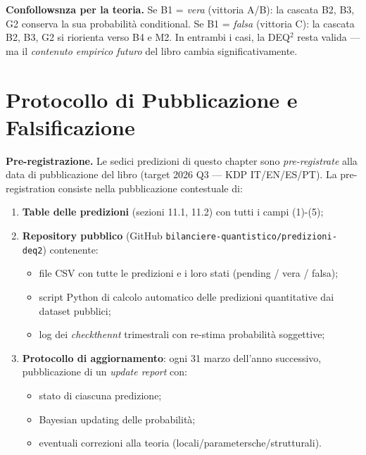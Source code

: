 \Hypoth{} \textbf{Confollowsnza per la teoria.} Se B1 = \emph{vera}
(vittoria A/B): la cascata B2, B3, G2 conserva la sua probabilità
conditional. Se B1 = \emph{falsa} (vittoria C): la cascata B2, B3, G2
si riorienta verso B4 e M2. In entrambi i casi, la DEQ$^2$ resta valida ---
ma il \emph{contenuto empirico futuro} del libro cambia
significativamente.



\section{Protocollo di Pubblicazione e
Falsificazione}\label{protocollo-di-pubblicazione-e-falsification}

\Hypoth{} \textbf{Pre-registrazione.} Le sedici predizioni di questo
chapter sono \emph{pre-registrate} alla data di pubblicazione del libro
(target 2026 Q3 --- KDP IT/EN/ES/PT). La pre-registration consiste
nella pubblicazione contestuale di:

\begin{enumerate}
\def\labelenumi{\arabic{enumi}.}
\tightlist
\item
  \textbf{Table delle predizioni} (sezioni 11.1, 11.2) con tutti i
  campi (1)-(5);
\item
  \textbf{Repository pubblico} (GitHub
  \texttt{bilanciere-quantistico/predizioni-deq2}) contenente:

  \begin{itemize}
  \tightlist
  \item
    file CSV con tutte le predizioni e i loro stati (pending / vera /
    falsa);
  \item
    script Python di calcolo automatico delle predizioni quantitative
    dai dataset pubblici;
  \item
    log dei \emph{checkthennt} trimestrali con re-stima probabilità
    soggettive;
  \end{itemize}
\item
  \textbf{Protocollo di aggiornamento}: ogni 31 marzo dell'anno
  successivo, pubblicazione di un \emph{update report} con:

  \begin{itemize}
  \tightlist
  \item
    stato di ciascuna predizione;
  \item
    Bayesian updating delle probabilità;
  \item
    eventuali correzioni alla teoria (locali/parametersche/strutturali).
  \end{itemize}
\end{enumerate}

